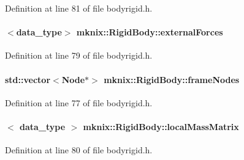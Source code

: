 Definition at line 81 of file bodyrigid.\+h.

\hypertarget{classmknix_1_1_rigid_body_ab465103ed21d529c66733705ad5b588c}{}
\paragraph[{external\+Forces}]{$<${\bf data\+\_\+type}$>$ mknix\+::\+Rigid\+Body\+::external\+Forces\hspace{0.3cm}{\ttfamily [protected]}}\label{classmknix_1_1_rigid_body_ab465103ed21d529c66733705ad5b588c}


Definition at line 79 of file bodyrigid.\+h.

\hypertarget{classmknix_1_1_rigid_body_a8ecbeb686c302e33e0885db701f0b8f9}{}
\paragraph[{frame\+Nodes}]{\setlength{\rightskip}{0pt plus 5cm}std\+::vector$<${\bf Node}$\ast$$>$ mknix\+::\+Rigid\+Body\+::frame\+Nodes\hspace{0.3cm}{\ttfamily [protected]}}\label{classmknix_1_1_rigid_body_a8ecbeb686c302e33e0885db701f0b8f9}


Definition at line 77 of file bodyrigid.\+h.

\hypertarget{classmknix_1_1_rigid_body_ae9b2edfc311425d483edaaf7100d6ab7}{}
\paragraph[{local\+Mass\+Matrix}]{$<$ {\bf data\+\_\+type} $>$ mknix\+::\+Rigid\+Body\+::local\+Mass\+Matrix\hspace{0.3cm}{\ttfamily [protected]}}\label{classmknix_1_1_rigid_body_ae9b2edfc311425d483edaaf7100d6ab7}


Definition at line 80 of file bodyrigid.\+h.

